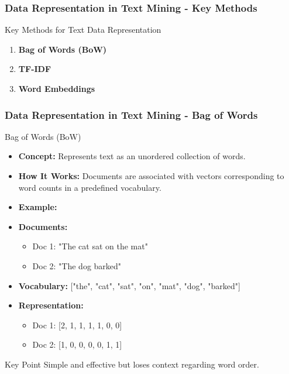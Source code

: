 \documentclass[aspectratio=169]{beamer}
\begin{document}
\begin{frame}[fragile]
    \frametitle{Data Representation in Text Mining - Key Methods}
    \begin{block}{Key Methods for Text Data Representation}
        \begin{enumerate}
            \item \textbf{Bag of Words (BoW)}
            \item \textbf{TF-IDF}
            \item \textbf{Word Embeddings}
        \end{enumerate}
    \end{block}
\end{frame}

\begin{frame}[fragile]
    \frametitle{Data Representation in Text Mining - Bag of Words}
    \begin{block}{Bag of Words (BoW)}
        \begin{itemize}
            \item \textbf{Concept:} Represents text as an unordered collection of words.
            \item \textbf{How It Works:} Documents are associated with vectors corresponding to word counts in a predefined vocabulary.
            \item \textbf{Example:}
        \end{itemize}
        \begin{itemize}
            \item \textbf{Documents:}
            \begin{itemize}
                \item Doc 1: "The cat sat on the mat"
                \item Doc 2: "The dog barked"
            \end{itemize}
            \item \textbf{Vocabulary:} ["the", "cat", "sat", "on", "mat", "dog", "barked"]
            \item \textbf{Representation:}
            \begin{itemize}
                \item Doc 1: [2, 1, 1, 1, 1, 0, 0]
                \item Doc 2: [1, 0, 0, 0, 0, 1, 1]
            \end{itemize}
        \end{itemize}
        \begin{block}{Key Point}
            Simple and effective but loses context regarding word order.
        \end{block}
    \end{block}
\end{frame}
\end{document}
